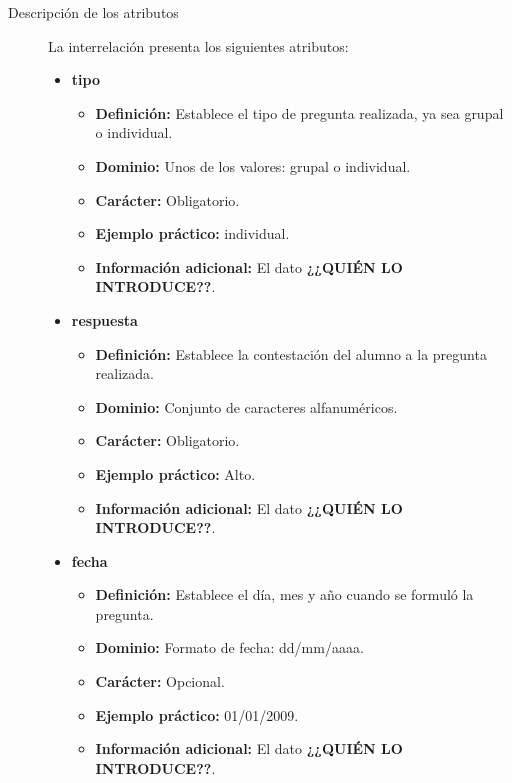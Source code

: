 \begin{description}
      \item[Descripción de los atributos] La interrelación presenta los
      siguientes atributos:

       \begin{itemize}
        \item \textbf{tipo}
          \begin{itemize}
            \item \textbf{Definición:} Establece el tipo de pregunta realizada,
            ya sea grupal o individual.
            \item \textbf{Dominio:} Unos de los valores: grupal o individual.
            \item \textbf{Carácter:} Obligatorio.
            \item \textbf{Ejemplo práctico:} individual.
            \item \textbf{Información adicional:} El dato \textbf{¿¿QUIÉN LO INTRODUCE??}.
         \end{itemize}
         \item \textbf{respuesta}
          \begin{itemize}
            \item \textbf{Definición:} Establece la contestación del alumno a la
            pregunta realizada.
            \item \textbf{Dominio:} Conjunto de caracteres alfanuméricos.
            \item \textbf{Carácter:} Obligatorio.
            \item \textbf{Ejemplo práctico:} Alto.
            \item \textbf{Información adicional:} El dato \textbf{¿¿QUIÉN LO INTRODUCE??}.
         \end{itemize}
          \item \textbf{fecha}
          \begin{itemize}
            \item \textbf{Definición:} Establece el día, mes y año cuando se
            formuló la pregunta.
            \item \textbf{Dominio:} Formato de fecha: dd/mm/aaaa.
            \item \textbf{Carácter:} Opcional.
            \item \textbf{Ejemplo práctico:} 01/01/2009.
            \item \textbf{Información adicional:} El dato \textbf{¿¿QUIÉN LO INTRODUCE??}.
         \end{itemize}
       \end{itemize}


\end{description}
